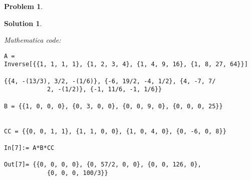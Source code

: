 \documentclass{article}
\theoremstyle{definition}
\newtheorem*{prob*}{Problem}
\newtheorem*{sln*}{Solution}
\begin{document}
\begin{prob*}
\begin{sln*}
\begin{enumerate}
\begin{enumerate}
				\textit{Mathematica code:}
				\begin{lstlisting}
A = 
Inverse[{{1, 1, 1, 1}, {1, 2, 3, 4}, {1, 4, 9, 16}, {1, 8, 27, 64}}]
				
{{4, -(13/3), 3/2, -(1/6)}, {-6, 19/2, -4, 1/2}, {4, -7, 7/
			2, -(1/2)}, {-1, 11/6, -1, 1/6}}
				
B = {{1, 0, 0, 0}, {0, 3, 0, 0}, {0, 0, 9, 0}, {0, 0, 0, 25}}
				
				
CC = {{0, 0, 1, 1}, {1, 1, 0, 0}, {1, 0, 4, 0}, {0, -6, 0, 8}}
						
In[7]:= A*B*CC
				
Out[7]= {{0, 0, 0, 0}, {0, 57/2, 0, 0}, {0, 0, 126, 0},
 			{0, 0, 0, 100/3}}
				\end{lstlisting}
			\end{enumerate}
		\end{enumerate}
		
	\end{sln*}






\end{prob*}

\newpage
\end{document}
